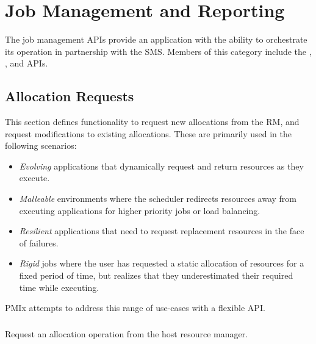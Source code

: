 \chapter{Job Management and Reporting}
\label{chap:api_job_mgmt}

The job management \acp{API} provide an application with the ability to orchestrate its operation in partnership with the \ac{SMS}.
Members of this category include the , , and  \acp{API}.

\section{Allocation Requests}
\label{chap:api_job_mgmt:alloc}

This section defines functionality to request new allocations from the \ac{RM}, and request modifications to existing allocations.
These are primarily used in the following scenarios:
\begin{itemize}
\item \textit{Evolving} applications that dynamically request and return resources as they execute.
\item \textit{Malleable} environments where the scheduler redirects resources away from executing applications for higher priority jobs or load balancing.
\item \textit{Resilient} applications that need to request replacement resources in the face of failures.
\item \textit{Rigid} jobs where the user has requested a static allocation of resources for a fixed period of time, but realizes that they underestimated their required time while executing.
\end{itemize}
\ac{PMIx} attempts to address this range of use-cases with a flexible \ac{API}.

\subsection{}

\summary

Request an allocation operation from the host resource manager.

